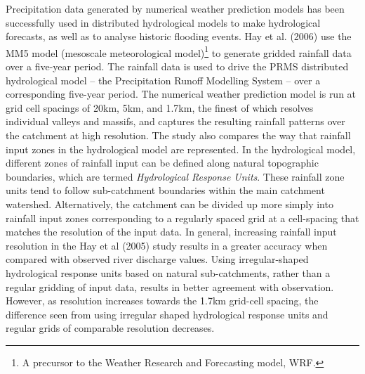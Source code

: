 Precipitation data generated by numerical weather prediction models has been successfully used in distributed hydrological models to make hydrological forecasts, as well as to analyse historic flooding events. Hay et al. (2006) use the MM5 model (mesoscale meteorological model)\footnote{A precursor to the Weather Research and Forecasting model, WRF.} to generate gridded rainfall data over a five-year period.  The rainfall data is used to drive the PRMS distributed hydrological model -- the Precipitation Runoff Modelling System -- over a corresponding five-year period. The numerical weather prediction model is run at grid cell spacings of 20km, 5km, and 1.7km, the finest of which resolves individual valleys and massifs, and captures the resulting rainfall patterns over the catchment at high resolution. The study also compares the way that rainfall input zones in the hydrological model are represented. In the hydrological model, different zones of rainfall input can be defined along natural topographic boundaries, which are termed \textit{Hydrological Response Units}. These rainfall zone units tend to follow sub-catchment boundaries within the main catchment watershed. Alternatively, the catchment can be divided up more simply into rainfall input zones corresponding to a regularly spaced grid at a cell-spacing that matches the resolution of the input data.
In general, increasing rainfall input resolution in the Hay et al (2005) study results in a greater accuracy when compared with observed river discharge values. Using irregular-shaped hydrological response units based on natural sub-catchments, rather than a regular gridding of input data, results in better agreement with observation. However, as resolution increases towards the 1.7km grid-cell spacing, the difference seen from using irregular shaped hydrological response units and regular grids of comparable resolution decreases. 

